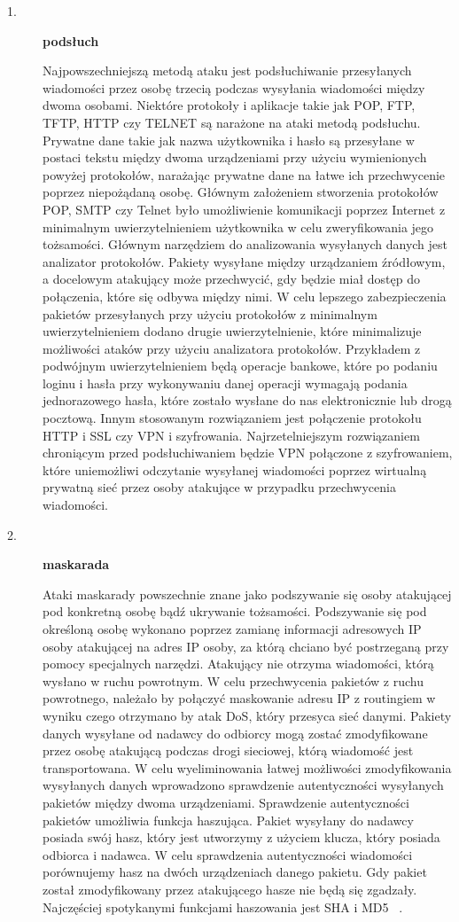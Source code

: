\documentclass[12p]{article}
\begin{document}
\begin{description}
\item [1. ] \textbf{podsłuch} 

\quad Najpowszechniejszą metodą ataku jest podsłuchiwanie przesyłanych wiadomości przez osobę trzecią podczas wysyłania wiadomości między dwoma osobami. Niektóre protokoły i aplikacje takie jak POP, FTP, TFTP, HTTP czy TELNET są narażone na ataki metodą podsłuchu. Prywatne dane takie jak nazwa użytkownika i hasło są przesyłane w postaci tekstu między dwoma urządzeniami przy użyciu wymienionych powyżej protokołów, narażając prywatne dane na łatwe ich przechwycenie poprzez niepożądaną osobę. Głównym założeniem stworzenia protokołów POP, SMTP czy Telnet było umożliwienie komunikacji poprzez Internet z minimalnym uwierzytelnieniem użytkownika w celu zweryfikowania jego tożsamości. Głównym narzędziem do analizowania wysyłanych danych jest analizator protokołów. Pakiety wysyłane między urządzaniem źródłowym, a docelowym atakujący może przechwycić, gdy będzie miał dostęp do połączenia, które się odbywa między nimi. W celu lepszego zabezpieczenia pakietów przesyłanych przy użyciu protokołów z minimalnym uwierzytelnieniem dodano drugie uwierzytelnienie, które minimalizuje możliwości ataków przy użyciu analizatora protokołów. Przykładem z podwójnym uwierzytelnieniem będą operacje bankowe, które po podaniu loginu i hasła przy wykonywaniu danej operacji wymagają podania jednorazowego hasła, które zostało wysłane do nas elektronicznie lub drogą pocztową. Innym stosowanym rozwiązaniem jest połączenie protokołu  HTTP i SSL czy VPN i szyfrowania. Najrzetelniejszym rozwiązaniem chroniącym przed podsłuchiwaniem będzie VPN połączone z szyfrowaniem, które uniemożliwi odczytanie wysyłanej wiadomości poprzez wirtualną prywatną sieć przez osoby atakujące w przypadku przechwycenia wiadomości.
\item [2. ]  \textbf{maskarada}

\quad Ataki maskarady powszechnie znane jako podszywanie się osoby atakującej pod konkretną osobę bądź ukrywanie tożsamości. Podszywanie się pod określoną osobę wykonano poprzez zamianę informacji adresowych IP osoby atakującej na adres IP osoby, za którą chciano być postrzeganą przy pomocy specjalnych narzędzi. Atakujący nie otrzyma wiadomości, którą wysłano w ruchu powrotnym. W celu przechwycenia pakietów z ruchu powrotnego, należało by połączyć maskowanie adresu IP z routingiem w wyniku czego otrzymano by atak DoS, który przesyca sieć danymi. Pakiety danych wysyłane od nadawcy do odbiorcy mogą zostać zmodyfikowane przez osobę atakującą podczas drogi sieciowej, którą wiadomość jest transportowana. W celu wyeliminowania łatwej możliwości zmodyfikowania wysyłanych danych wprowadzono sprawdzenie autentyczności wysyłanych pakietów między dwoma urządzeniami. Sprawdzenie autentyczności pakietów umożliwia funkcja haszująca. Pakiet wysyłany do nadawcy posiada swój hasz, który jest utworzymy z użyciem klucza, który posiada odbiorca i nadawca. W celu sprawdzenia autentyczności wiadomości porównujemy hasz na dwóch urządzeniach danego pakietu. Gdy pakiet został zmodyfikowany przez atakującego hasze nie będą się zgadzały. Najczęściej spotykanymi funkcjami haszowania jest SHA i MD5 ~\cite{maskaraka}.


\end{description}
\end{document}
